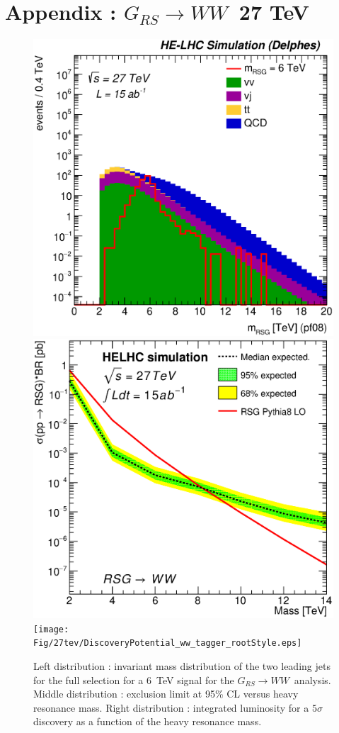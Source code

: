 \documentclass{cernrep}
\newcommand*{\zptt}{\ensuremath{Z^{\prime} \rightarrow \ttbar}}
\newcommand*{\rsg}{\ensuremath{G_{RS} \rightarrow WW}}
\begin{document}
\begin{table}[!htb]\centering
{}
\caption{Final yield of \zptt\ analysis.}
\label{tab:ZpttYield27}
\end{table}

\clearpage
\newpage

\section{Appendix : \rsg\ 27 TeV}
\label{appendix:rsgww27}

\begin{figure}[!htb]
  \centering
  \includegraphics[width=0.30\columnwidth]{Fig/27tev/RSGWW_Mj1j2_pf08_fit_sel4_nostack_log.eps}
  \includegraphics[width=0.30\columnwidth]{Fig/27tev/lim_RSGraviton_ww_helhc_v01.eps}
  \texttt{[image: Fig/27tev/DiscoveryPotential\_ww\_tagger\_rootStyle.eps]}
  \caption{Left distribution : invariant mass distribution of the two leading jets for the full selection for a 6~TeV signal for the \rsg\ analysis. Middle distribution : exclusion limit at 95\% CL versus heavy resonance mass. Right distribution : integrated luminosity for a $5\sigma$ discovery as a function of the heavy resonance mass.}
  \label{figure:hadronicresonances27:wwsel04}
\end{figure}
\end{document}

